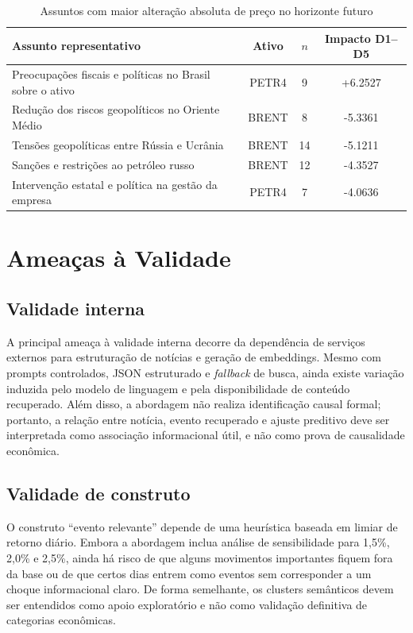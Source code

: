 \documentclass[12pt]{article}
\begin{document}
\begin{table}[H]
\centering
\small
\caption{Assuntos com maior alteração absoluta de preço no horizonte futuro}
\label{tab:topicos_impacto}
\begin{tabular}{l c c c}
\toprule
\textbf{Assunto representativo} & \textbf{Ativo} & \textbf{$n$} & \textbf{Impacto D1--D5} \\
\midrule
Preocupações fiscais e políticas no Brasil sobre o ativo & PETR4 & 9 & +6.2527 \\
Redução dos riscos geopolíticos no Oriente Médio & BRENT & 8 & -5.3361 \\
Tensões geopolíticas entre Rússia e Ucrânia & BRENT & 14 & -5.1211 \\
Sanções e restrições ao petróleo russo & BRENT & 12 & -4.3527 \\
Intervenção estatal e política na gestão da empresa & PETR4 & 7 & -4.0636 \\
\bottomrule
\end{tabular}
\end{table}

\section{Ameaças à Validade}

\subsection{Validade interna}

A principal ameaça à validade interna decorre da dependência de serviços externos para estruturação de notícias e geração de embeddings. Mesmo com prompts controlados, JSON estruturado e \textit{fallback} de busca, ainda existe variação induzida pelo modelo de linguagem e pela disponibilidade de conteúdo recuperado. Além disso, a abordagem não realiza identificação causal formal; portanto, a relação entre notícia, evento recuperado e ajuste preditivo deve ser interpretada como associação informacional útil, e não como prova de causalidade econômica.

\subsection{Validade de construto}

O construto ``evento relevante'' depende de uma heurística baseada em limiar de retorno diário. Embora a abordagem inclua análise de sensibilidade para 1,5\%, 2,0\% e 2,5\%, ainda há risco de que alguns movimentos importantes fiquem fora da base ou de que certos dias entrem como eventos sem corresponder a um choque informacional claro. De forma semelhante, os clusters semânticos devem ser entendidos como apoio exploratório e não como validação definitiva de categorias econômicas.
\end{document}

